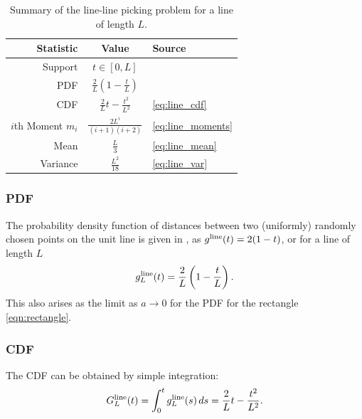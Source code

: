 \begin{table}[ht]
  \centering
  \begin{tabular}{|r|c|l|}
    \hline
    Statistic & Value & Source \\ 
    \hline
      Support            & $t \in [0, L]$ & \\
      PDF                & $\displaystyle \frac{2}{L} \left( 1-\frac{t}{L} \right)$ &
                             \cite{weisstein:_line_line_picking,b.ghosh51:_random_rect} \\
      CDF                & $\displaystyle \frac{2}{L} t - \frac{t^2}{L^2}$ & 
                             \eqref{eq:line_cdf}\\
      $i$th Moment $m_i$ & $\displaystyle \frac{2 L^{i}}{(i+1)(i+2)}$ &
                             \eqref{eq:line_moments} \\
      Mean               & $\displaystyle \frac{L}{3}$ &
                             \eqref{eq:line_mean} \\
      Variance           & $\displaystyle \frac{L^2}{18}$ &
                             \eqref{eq:line_var} \\[1.5ex]
    \hline
  \end{tabular}
  \caption{Summary of the line-line picking problem for a line of
    length $L$.}
  \label{tab:summary_line}
\end{table}

\subsubsection{PDF}

The probability density function of distances between two (uniformly)
randomly chosen points on the unit line is given in
\cite{weisstein:_line_line_picking,b.ghosh51:_random_rect}, as
$g^{\rm line}(t) = 2(1-t)$, or for a line of length $L$
\begin{equation}
  \label{eq:line_line}
  g^{\rm line}_L(t) = \frac{2}{L} \left( 1-\frac{t}{L} \right).
\end{equation}
This also arises as the limit as $a \rightarrow 0$ for the PDF for the
rectangle \eqref{eqn:rectangle}. 

\subsubsection{CDF}

The CDF can be obtained by simple integration:
\begin{equation}
  \label{eq:line_cdf}
    G^{\rm line}_L(t)
 = \int_0^t g^{\rm line}_L(s) \, ds
 =  \frac{2}{L} t - \frac{t^2}{L^2}. 
\end{equation}

